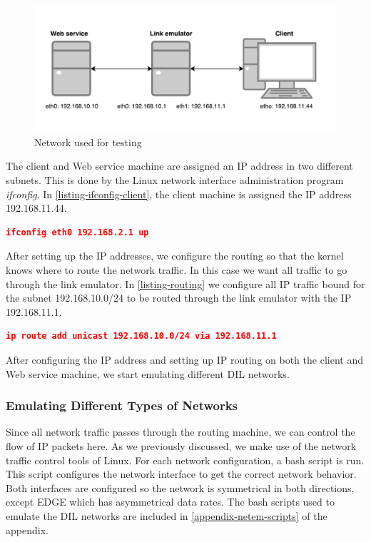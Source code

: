 \begin{figure}[h]
\includegraphics[width=\textwidth]{images/testing_environment.png}
\caption{Network used for testing}
\label{figure-testing-environment}
\end{figure}

The client and Web service machine are assigned an IP address in two different
subnets. This is done by the Linux network interface administration program
\textit{ifconfig}. In \cref{listing-ifconfig-client}, the client machine is
assigned the IP address 192.168.11.44.

\begin{lstlisting}[frame=single, language=json, caption="Setting the IP address a network interface", label=listing-ifconfig-client]
ifconfig eth0 192.168.2.1 up
\end{lstlisting}

After setting up the IP addresses, we configure the routing so that the kernel
knows where to route the network traffic. In this case we want all traffic to go
through the link emulator. In \cref{listing-routing} we configure all IP traffic
bound for the subnet 192.168.10.0/24 to be routed through the link emulator with
the IP 192.168.11.1.

\begin{lstlisting}[frame=single, language=json, caption="Configuring routing rules", label=listing-routing]
ip route add unicast 192.168.10.0/24 via 192.168.11.1
\end{lstlisting}

After configuring the IP address and setting up IP routing on both the client
and Web service machine, we start emulating different DIL networks.

\subsubsection{Emulating Different Types of Networks}

Since all network traffic passes through the routing machine, we can control the
flow of IP packets here. As we previously discussed, we make use of the network
traffic control tools of Linux. For each network configuration, a bash script is
run. This script configures the network interface to get the correct network
behavior. Both interfaces are configured so the network is symmetrical in both
directions, except EDGE which has asymmetrical data rates. The bash scripts used
to emulate the DIL networks are included in \cref{appendix-netem-scripts} of the
appendix.


